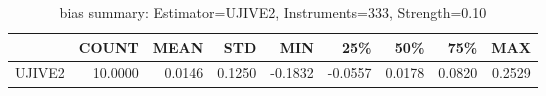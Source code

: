 \begin{table}[ht]
\centering
\caption{bias summary: Estimator=UJIVE2, Instruments=333, Strength=0.10}
\begin{tabular}{lrrrrrrrr}
\toprule
 & COUNT & MEAN & STD & MIN & 25\% & 50\% & 75\% & MAX \\
\midrule
UJIVE2 & 10.0000 & 0.0146 & 0.1250 & -0.1832 & -0.0557 & 0.0178 & 0.0820 & 0.2529 \\
\bottomrule
\end{tabular}
\end{table}
